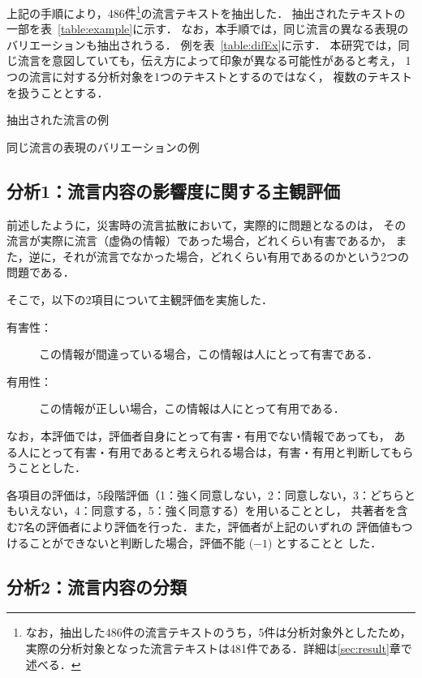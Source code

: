 \documentclass[japanese]{jnlp_1.4}
\begin{document}
上記の手順により，486件\footnote{なお，抽出した486件の流言テキストのうち，5件は分析対象外としたため，実際の分析対象となった流言テキストは481件である．詳細は\ref{sec:result}章で述べる．}の流言テキストを抽出した．
抽出されたテキストの一部を表~\ref{table:example}に示す．
なお，本手順では，同じ流言の異なる表現のバリエーションも抽出されうる．
例を表~\ref{table:difEx}に示す．
本研究では，同じ流言を意図していても，伝え方によって印象が異なる可能性があると考え，
1つの流言に対する分析対象を1つのテキストとするのではなく，
複数のテキストを扱うこととする．

\begin{table}[t]
\caption{抽出された流言の例}
\label{table:example}

\end{table}
\begin{table}[t]
\caption{同じ流言の表現のバリエーションの例}
\label{table:difEx}

\end{table}


\subsection{分析1：流言内容の影響度に関する主観評価}

前述したように，災害時の流言拡散において，実際的に問題となるのは，
その流言が実際に流言（虚偽の情報）であった場合，どれくらい有害であるか，
また，逆に，それが流言でなかった場合，どれくらい有用であるのかという2つの問題である．

そこで，以下の2項目について主観評価を実施した．
\begin{description}
\item[有害性：] この情報が間違っている場合，この情報は人にとって有害である．
\item[有用性：] この情報が正しい場合，この情報は人にとって有用である．
\end{description}
なお，本評価では，評価者自身にとって有害・有用でない情報であっても，
ある人にとって有害・有用であると考えられる場合は，有害・有用と判断してもらうこととした．

各項目の評価は，5段階評価（1：強く同意しない，2：同意しない，3：どちらともいえない，4：同意する，5：強く同意する）を用いることとし，
共著者を含む7名の評価者により評価を行った．また，評価者が上記のいずれの
評価値もつけることができないと判断した場合，評価不能 ($-1$) とすることと
した．


\subsection{分析2：流言内容の分類}
\end{document}
